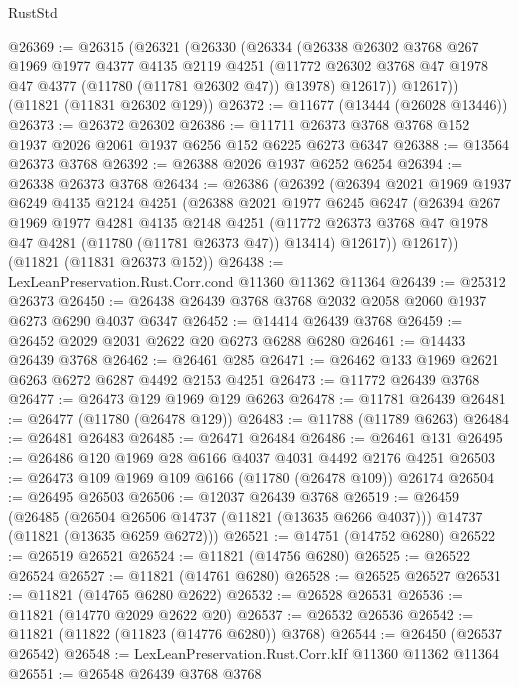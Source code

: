 \begin{lexlean}{RustStd}
\begin{coremodule}
@26369 := @26315
    (@26321
      (@26330
        (@26334
          (@26338
            @26302
            @3768
            @267
            @1969
            @1977
            @4377
            @4135
            @2119
            @4251
            (@11772 @26302 @3768 @47 @1978 @47 @4377 (@11780 (@11781 @26302 @47)) @13978)
            @12617))
        @12617))
    (@11821 (@11831 @26302 @129))
@26372 := @11677 (@13444 (@26028 @13446))
@26373 := @26372 @26302
@26386 := @11711 @26373 @3768 @3768 @152 @1937 @2026 @2061 @1937 @6256 @152 @6225 @6273 @6347
@26388 := @13564 @26373 @3768
@26392 := @26388 @2026 @1937 @6252 @6254
@26394 := @26338 @26373 @3768
@26434 := @26386
    (@26392
      (@26394
        @2021
        @1969
        @1937
        @6249
        @4135
        @2124
        @4251
        (@26388
          @2021
          @1977
          @6245
          @6247
          (@26394
            @267
            @1969
            @1977
            @4281
            @4135
            @2148
            @4251
            (@11772 @26373 @3768 @47 @1978 @47 @4281 (@11780 (@11781 @26373 @47)) @13414)
            @12617))
        @12617))
    (@11821 (@11831 @26373 @152))
@26438 := LexLeanPreservation.Rust.Corr.cond @11360 @11362 @11364
@26439 := @25312 @26373
@26450 := @26438 @26439 @3768 @3768 @2032 @2058 @2060 @1937 @6273 @6290 @4037 @6347
@26452 := @14414 @26439 @3768
@26459 := @26452 @2029 @2031 @2622 @20 @6273 @6288 @6280
@26461 := @14433 @26439 @3768
@26462 := @26461 @285
@26471 := @26462 @133 @1969 @2621 @6263 @6272 @6287 @4492 @2153 @4251
@26473 := @11772 @26439 @3768
@26477 := @26473 @129 @1969 @129 @6263
@26478 := @11781 @26439
@26481 := @26477 (@11780 (@26478 @129))
@26483 := @11788 (@11789 @6263)
@26484 := @26481 @26483
@26485 := @26471 @26484
@26486 := @26461 @131
@26495 := @26486 @120 @1969 @28 @6166 @4037 @4031 @4492 @2176 @4251
@26503 := @26473 @109 @1969 @109 @6166 (@11780 (@26478 @109)) @26174
@26504 := @26495 @26503
@26506 := @12037 @26439 @3768
@26519 := @26459
    (@26485
      (@26504 @26506 @14737 (@11821 (@13635 @6266 @4037)))
      @14737
      (@11821 (@13635 @6259 @6272)))
@26521 := @14751 (@14752 @6280)
@26522 := @26519 @26521
@26524 := @11821 (@14756 @6280)
@26525 := @26522 @26524
@26527 := @11821 (@14761 @6280)
@26528 := @26525 @26527
@26531 := @11821 (@14765 @6280 @2622)
@26532 := @26528 @26531
@26536 := @11821 (@14770 @2029 @2622 @20)
@26537 := @26532 @26536
@26542 := @11821 (@11822 (@11823 (@14776 @6280)) @3768)
@26544 := @26450 (@26537 @26542)
@26548 := LexLeanPreservation.Rust.Corr.kIf @11360 @11362 @11364
@26551 := @26548 @26439 @3768 @3768

\end{coremodule}
\end{lexlean}
